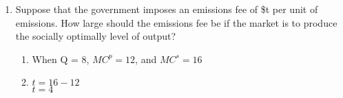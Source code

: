 \documentclass[11pt]{article}
\begin{document}
\begin{enumerate}
\begin{enumerate}
   	\item Suppose that the government imposes an emissions fee of \$t per unit of emissions. How large should the emissions fee be if the market is to produce the socially optimally level of output?
   	\begin{enumerate}
        \item When Q = 8, $MC^p = 12$, and $MC^s = 16$
        \item $t = 16 - 12$\\
        $t = 4$
    \end{enumerate}
	\end{enumerate}

\end{enumerate}
\end{document}
